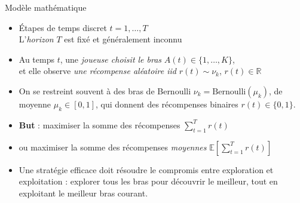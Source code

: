 \documentclass[11pt,french,ignorenonframetext,]{beamer}
\begin{document}
\begin{frame}{Modèle mathématique}

\begin{itemize}
  \item
  Étapes de temps discret $t = 1, \dots, T$\\
  L'\emph{horizon} $T$ est fixé et généralement inconnu

  \item
  Au temps $t$, une \emph{joueuse choisit le bras} $A(t)\in\{1,\dots,K\}$,\\
  et elle observe \emph{une récompense aléatoire iid} $r(t) \sim \nu_k$, $r(t)\in\mathbb{R}$

  \pause
  \item
  On se restreint souvent à des bras de Bernoulli $\nu_k = \mathrm{Bernoulli}(\mu_k)$, de moyenne $\mu_k\in[0,1]$,
  qui donnent des récompenses binaires $r(t) \in\{0,1\}$.

  \pause
  \item
  \textbf{But} : maximiser la somme des récompenses $\sum\limits_{t=1}^T r(t)$

  \item
  ou \alert{maximiser la somme des récompenses \emph{moyennes} $\mathbb{E}\left[ \sum\limits_{t=1}^T r(t) \right]$}

  \pause
  \item
  Une stratégie efficace doit résoudre le \alert{compromis entre exploration et exploitation} :
  explorer tous les bras pour découvrir le meilleur,
  tout en exploitant le meilleur bras courant.
\end{itemize}

\end{frame}




\end{document}
